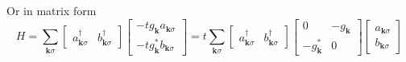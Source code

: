 \documentclass[../../../main.tex]{subfiles}
\begin{document}
Or in matrix form
\begin{equation*}
  H  = \sum_{\mathbf{k}\sigma}
  \begin{bmatrix} a_{\mathbf{k}\sigma}^\dagger & b_{\mathbf{k}\sigma}^\dagger \end{bmatrix}
  \begin{bmatrix} -t g_\mathbf{k} a_{\mathbf{k }\sigma} \\ -t g_\mathbf{k}^* b_{\mathbf{k }\sigma} \end{bmatrix}
  = t\sum_{\mathbf{k}\sigma}
  \begin{bmatrix} a_{\mathbf{k}\sigma}^\dagger & b_{\mathbf{k}\sigma}^\dagger \end{bmatrix}
  \begin{bmatrix} 0 & - g_\mathbf{k} \\ - g_\mathbf{k}^* & 0 \end{bmatrix}
  \begin{bmatrix} a_{\mathbf{k}\sigma} \\ b_{\mathbf{k}\sigma} \end{bmatrix}
\end{equation*}
\end{document}
